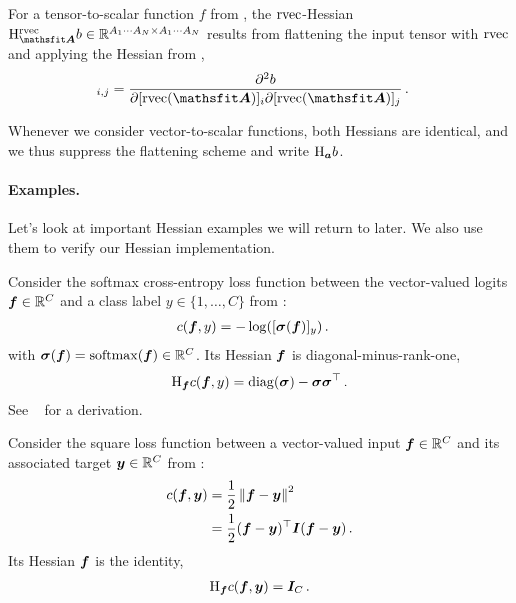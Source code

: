 \begin{definition}\label{def:rvec_hessian}
  For a tensor-to-scalar function $f$ from , the $\operatorname{rvec}$-Hessian $\hess_{\tA}^{\rvec}b \in \sR^{A_1 \cdots A_N \times A_1 \cdots A_N}$ results from flattening the input tensor with $\operatorname{rvec}$ and applying the Hessian from ,
  \begin{align*}
    [\hess^{\rvec}_{\tA}b]_{i, j}
     & =
    \frac{\partial^2 b}{\partial [\rvec(\tA)]_{i} \partial [\rvec(\tA)]_{j}}\,.
  \end{align*}
\end{definition}

Whenever we consider vector-to-scalar functions, both Hessians are identical, and we thus suppress the flattening scheme and write $\mathrm{H}_{{\bm{a}}}b$.

\paragraph{Examples.}
Let's look at important Hessian examples we will return to later.
We also use them to verify our Hessian implementation.

\switchcolumn[1]
\switchcolumn[0]

\begin{example}\label{ex:hessian-crossentropyloss}
  Consider the softmax cross-entropy loss function between the vector-valued logits ${\bm{f}} \in {\mathbb{R}}^C$ and a class label $y \in \{1, \dots, C\}$ from :
  \begin{align*}
    c({\bm{f}}, y)
     & =
    -\log([{\bm{\sigma}}({\bm{f}})]_y)\,.
  \end{align*}
  with ${\bm{\sigma}}({\bm{f}}) = \mathrm{softmax}({\bm{f}}) \in {\mathbb{R}}^C$.
  Its Hessian \wrt ${\bm{f}}$ is diagonal-minus-rank-one,
  \begin{align*}
    \mathrm{H}_{{\bm{f}}} c({\bm{f}}, y)
    =
    \operatorname{diag}({\bm{\sigma}}) - {\bm{\sigma}} {\bm{\sigma}}^\top\,.
  \end{align*}
  See \eg~\citet{dangel2020modular} for a derivation.
\end{example}

\switchcolumn[1]

\switchcolumn[0]
\begin{example}\label{ex:square_loss_hessian}
  Consider the square loss function between a vector-valued input ${\bm{f}} \in {\mathbb{R}}^C$ and its associated target ${\bm{y}} \in {\mathbb{R}}^C$ from :
  \begin{align*}
    c({\bm{f}}, {\bm{y}})
     & =
    \frac{1}{2}\left\lVert
    {\bm{f}} - {\bm{y}}
    \right\rVert^2
    \\
     & =
    \frac{1}{2}({\bm{f}} - {\bm{y}})^{\top} {\bm{I}} ({\bm{f}} - {\bm{y}})\,.
  \end{align*}
  Its Hessian \wrt ${\bm{f}}$ is the identity,
  \begin{align*}
    \mathrm{H}_{{\bm{f}}} c({\bm{f}}, {\bm{y}})
    =
    {\bm{I}}_C\,.
  \end{align*}
\end{example}

